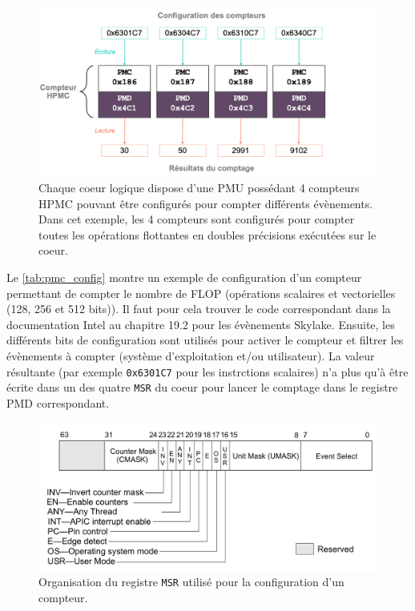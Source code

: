             \begin{figure}[ht!]
            \center
            \includegraphics[width=14cm]{images/edl_perf_hpmc.png}
            \caption{\label{pic:edl_perf_hpmc} Chaque coeur logique dispose d'une PMU possédant 4 compteurs HPMC pouvant être configurés pour compter différents évènements. Dans cet exemple, les 4 compteurs sont configurés pour compter toutes les opérations flottantes en doubles précisions exécutées sur le coeur.}
            \end{figure}
            
            
            Le \autoref{tab:pmc_config} montre un exemple de configuration d'un compteur permettant de compter le nombre de \gls{FLOP} (opérations scalaires et vectorielles (128, 256 et 512 bits)). Il faut pour cela trouver le code correspondant dans la documentation Intel \cite{Intel2018} au chapitre 19.2 pour les évènements Skylake. Ensuite, les différents bits de configuration sont utilisés pour activer le compteur et filtrer les évènements à compter (système d'exploitation et/ou utilisateur). La valeur résultante (par exemple \verb|0x6301C7| pour les instrctions scalaires) n'a plus qu'à être écrite dans un des quatre \verb|MSR| du coeur pour lancer le comptage dans le registre PMD correspondant.
          
            
            
            \begin{figure}
            \center
            \includegraphics[width=14cm]{images/eld_perf_pmc.png}
            \caption{\label{pic:eld_perf_pmc}Organisation du registre \texttt{MSR} utilisé pour la configuration d'un compteur.}
            \end{figure}
            
